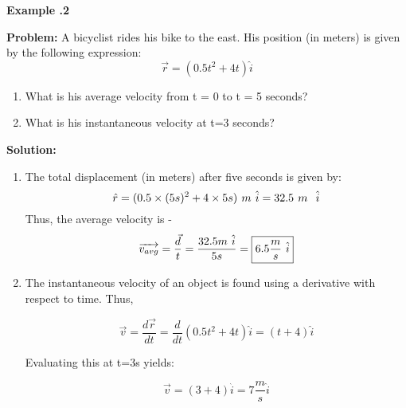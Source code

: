 \begin{mdframed}[backgroundcolor=blue!10!white]
	\begin{center}
		
		
		\textbf{Example \thesection.2}	
	\end{center}
	
	\textbf{Problem: }A bicyclist rides his bike to the east.  His position (in meters) is given by the following expression:
	\begin{equation*}
	\vec{r} = (0.5 t^2 + 4t) \hat{i}
	\end{equation*}
	\begin{enumerate}[label=\alph*.]
		\item What is his average velocity from t = 0 to t = 5 seconds?
		\item What is his instantaneous velocity at t=3 seconds?
	\end{enumerate}
	\vspace{0.1in}
	\textbf{Solution:} \begin{enumerate}[label=\alph*.]
		\item The total displacement (in meters) after five seconds is given by: 
		\begin{equation*}
		\hat{r} = (0.5 \times (5s)^2+4\times 5s) \hspace{0.05in} m \hspace{0.05in} \hat{i} = 32.5 \hspace{0.05in} m \hspace{0.05in} \hspace{0.05in} \hat{i}
		\end{equation*}
		Thus, the average velocity is - 
	\begin{equation*}
	\overrightarrow{v_{avg}}  = \frac{\vec{d}}{t} = \frac{32.5 m \hspace{0.05in} \hat{i}}{5s}  = \boxed{6.5 \frac{m}{s} \hspace{0.05in} \hat{i}}
	\end{equation*}
	
	
	
	\item The instantaneous velocity of an object is found using a derivative with respect to time.  Thus,
	
	\begin{equation*}
	\vec{v} = \frac{d\vec{r}}{dt} = \frac{d}{dt} (0.5 t^2 + 4t) \hat{i} = (t + 4) \hat{i} 
	\end{equation*}
	
	Evaluating this at t=3s yields:
	
	\begin{equation*}
	\vec{v} = (3 + 4) \hat{i} = 7 \frac{m}{s} \hat{i}
	\end{equation*}
	\end{enumerate}
	
\end{mdframed}

